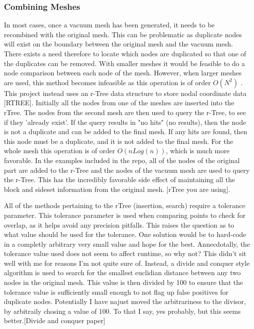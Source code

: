 \documentclass[12pt, letterpaper]{article}
\begin{document}
\subsubsection{Combining Meshes} \label{rTree}
In most cases, once a vacuum mesh has been generated, it needs to be recombined with the original mesh. This can be problematic as duplicate nodes will exist on the boundary between the original mesh and the vacuum mesh. There exists a need therefore to locate which nodes are duplicated so that one of the duplicates can be removed. With smaller meshes it would be feasible to do a node comparison between each node of the mesh. However, when larger meshes are used, this method becomes infeasible as this operation is of order $O(N^2)$ . This project instead uses an r-Tree data structure to store nodal coordinate data [RTREE]. Initially all the nodes from one of the meshes are inserted into the rTree. The nodes from the second mesh are then used to query the r-Tree, to see if they 'already exist'. If the query results in "no hits" (no results), then the node is not a duplicate and can be added to the final mesh. If any hits are found, then this node must be a duplicate, and it is not added to the final mesh. For the whole mesh this operation is of order $O(nLog(n))$, which is much more favorable. In the examples included in the repo, all of the nodes of the original part are added to the r-Tree and the nodes of the vacuum mesh are used to query the r-Tree. This has the incredibly favorable side effect of maintaining all the block and sideset information from the original mesh. [rTree you are using].

All of the methods pertaining to the rTree (insertion, search) require a tolerance parameter. This tolerance parameter is used when comparing points to check for overlap, as it helps avoid any precision pitfalls. This raises the question as to what value should be used for the tolerance. One solution would be to hard-code in a completly arbitrary very small value and hope for the best. Annecdotally, the tolerance value used does not seem to affect runtime, so why not? This didn't sit well with me for reasons I'm not quite sure of. Instead, a divide and conquer style algorithm is used to search for the smallest euclidian distance between any two nodes in the original mesh. This value is then divided by 100 to ensure that the tolerance value is sufficiently small enough to not flag up false positives for duplicate nodes. Potentially I have najust moved the arbitrariness to the divisor, by arbitraily chosing a value of 100. To that I say, yes probably, but this seems better.[Divide and conquer paper]
\end{document}
